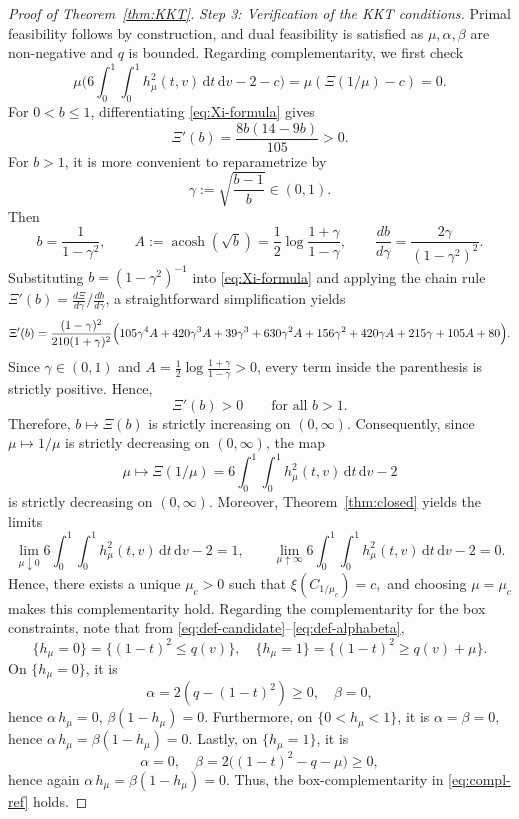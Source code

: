 \documentclass{article}
\DeclareMathOperator{\acosh}{acosh}
\newcommand{\1}{\mathds{1}}
\newcommand{\de}{\mathrm{\,d}}
\begin{document}
\begin{proof}[Proof of Theorem~\ref{thm:KKT}]
\smallskip
\emph{Step 3: Verification of the KKT conditions.}
Primal feasibility follows by construction, and dual feasibility is satisfied as $\mu, \alpha, \beta$ are non-negative and $q$ is bounded. 
Regarding complementarity, we first check 
\[
  \mu\Big(6\int_0^1\int_0^1 h_\mu^2(t,v)\de t\de v-2-c\Big) = \mu(\Xi(1/\mu) - c) = 0.
\]
For \(0<b\le 1\), differentiating \eqref{eq:Xi-formula} gives
\[
\Xi'(b)=\frac{8b(14-9b)}{105}>0.
\]
For \(b>1\), it is more convenient to reparametrize by
\[
\gamma:=\sqrt{\frac{b-1}{b}}\in(0,1).
\]
Then
\[
b=\frac{1}{1-\gamma^2},
\qquad
A:=\acosh(\sqrt b)=\frac12\log\!\frac{1+\gamma}{1-\gamma},
\qquad
\frac{db}{d\gamma}=\frac{2\gamma}{(1-\gamma^2)^2}.
\]
Substituting \(b=(1-\gamma^2)^{-1}\) into \eqref{eq:Xi-formula} and applying the chain rule \(\Xi'(b) = \frac{d\Xi}{d\gamma} \big/ \frac{db}{d\gamma}\), a straightforward simplification yields
\[
\Xi'(b)
=
\frac{(1-\gamma)^2}{210(1+\gamma)^2}
\Bigl(
105\gamma^4A
+420\gamma^3A
+39\gamma^3
+630\gamma^2A
+156\gamma^2
+420\gamma A
+215\gamma
+105A
+80
\Bigr).
\]
Since \(\gamma\in(0,1)\) and \(A=\frac12\log\!\frac{1+\gamma}{1-\gamma}>0\), every term inside the parenthesis is strictly positive. Hence,
\[
\Xi'(b)>0
\qquad\text{for all } b>1.
\]
Therefore, \(b\mapsto \Xi(b)\) is strictly increasing on \((0,\infty)\).
Consequently, since \(\mu\mapsto 1/\mu\) is strictly decreasing on \((0,\infty)\), the map
\[
\mu\mapsto \Xi(1/\mu)
=
6\int_0^1\int_0^1 h_\mu^2(t,v)\de t\de v-2
\]
is strictly decreasing on \((0,\infty)\).
Moreover, Theorem~\ref{thm:closed} yields the limits
\begin{equation}\label{eq:limits_xi_mu}
\lim_{\mu\downarrow 0}6\int_0^1\int_0^1 h_\mu^2(t,v)\de t\de v-2=1,\qquad
\lim_{\mu\uparrow\infty}6\int_0^1\int_0^1 h_\mu^2(t,v)\de t\de v-2=0.
\end{equation}
Hence, there exists a unique $\mu_c>0$ such that
\(
\xi(C_{1/\mu_c})=c,
\)
and choosing $\mu=\mu_c$ makes this complementarity hold.
Regarding the complementarity for the box constraints, note that from \eqref{eq:def-candidate}–\eqref{eq:def-alphabeta},
\[
  \{h_\mu=0\}=\{(1-t)^2\le q(v)\},\quad
  \{h_\mu=1\}=\{(1-t)^2\ge q(v)+\mu\}.
\]
On $\{h_\mu=0\}$, it is
\[
\alpha=2(q-(1-t)^2)\ge 0, \quad \beta=0,
\]
hence $\alpha\,h_\mu=0$, $\beta(1-h_\mu)=0$.
Furthermore, on $\{0<h_\mu<1\}$, it is
\(
\alpha=\beta=0,
\)
hence $\alpha\,h_\mu=\beta(1-h_\mu)=0$.
Lastly, on $\{h_\mu=1\}$, it is
\[
\alpha=0,\quad\beta=2\big((1-t)^2-q-\mu\big)\ge 0,
\]
hence again $\alpha\,h_\mu=\beta(1-h_\mu)=0$.
Thus, the box-complementarity in \eqref{eq:compl-ref} holds.


\end{proof}
\end{document}
